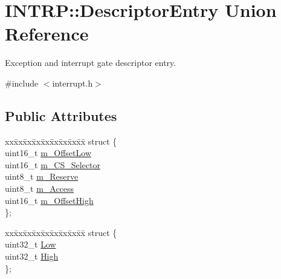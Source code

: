 \hypertarget{union_i_n_t_r_p_1_1_descriptor_entry}{}\section{I\+N\+T\+RP\+:\+:Descriptor\+Entry Union Reference}
\label{union_i_n_t_r_p_1_1_descriptor_entry}


Exception and interrupt gate descriptor entry.  




{\ttfamily \#include $<$interrupt.\+h$>$}

\subsection*{Public Attributes}
\begin{DoxyCompactItemize}
\item 
\begin{tabbing}
xx\=xx\=xx\=xx\=xx\=xx\=xx\=xx\=xx\=\kill
struct \{\\
\>uint16\_t \hyperlink{union_i_n_t_r_p_1_1_descriptor_entry_ad1b891ed37e3770aa5329ba8dc768cc7}{m\_OffsetLow}\\
\>uint16\_t \hyperlink{union_i_n_t_r_p_1_1_descriptor_entry_acc9a18e707a0396fa95b51e2737d172f}{m\_CS\_Selector}\\
\>uint8\_t \hyperlink{union_i_n_t_r_p_1_1_descriptor_entry_a47989742adb5c6d56c7d4bcf943770b5}{m\_Reserve}\\
\>uint8\_t \hyperlink{union_i_n_t_r_p_1_1_descriptor_entry_a431c102e5f096230dbe44160e7a611c1}{m\_Access}\\
\>uint16\_t \hyperlink{union_i_n_t_r_p_1_1_descriptor_entry_a9c62dca789f6a7c02513eb17f1a3de04}{m\_OffsetHigh}\\
\}; \\

\end{tabbing}\item 
\begin{tabbing}
xx\=xx\=xx\=xx\=xx\=xx\=xx\=xx\=xx\=\kill
struct \{\\
\>uint32\_t \hyperlink{union_i_n_t_r_p_1_1_descriptor_entry_ab3b735689731cd8b58ae8f9bf0f9fc42}{Low}\\
\>uint32\_t \hyperlink{union_i_n_t_r_p_1_1_descriptor_entry_a479e62ef6f3e27e03e121d965d6bab99}{High}\\
\}; \\

\end{tabbing}\end{DoxyCompactItemize}


